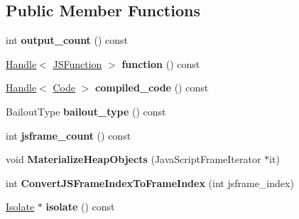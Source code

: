 \subsection*{Public Member Functions}
\begin{DoxyCompactItemize}
\item 
int {\bfseries output\+\_\+count} () const \hypertarget{classv8_1_1internal_1_1_deoptimizer_a9d094f3a522f8ade8b6616045354ca9d}{}\label{classv8_1_1internal_1_1_deoptimizer_a9d094f3a522f8ade8b6616045354ca9d}

\item 
\hyperlink{classv8_1_1internal_1_1_handle}{Handle}$<$ \hyperlink{classv8_1_1internal_1_1_j_s_function}{J\+S\+Function} $>$ {\bfseries function} () const \hypertarget{classv8_1_1internal_1_1_deoptimizer_a9599e6c218c79de5ce5399ac137181c4}{}\label{classv8_1_1internal_1_1_deoptimizer_a9599e6c218c79de5ce5399ac137181c4}

\item 
\hyperlink{classv8_1_1internal_1_1_handle}{Handle}$<$ \hyperlink{classv8_1_1internal_1_1_code}{Code} $>$ {\bfseries compiled\+\_\+code} () const \hypertarget{classv8_1_1internal_1_1_deoptimizer_a5efa915656110fd0b24db9472a23ed05}{}\label{classv8_1_1internal_1_1_deoptimizer_a5efa915656110fd0b24db9472a23ed05}

\item 
Bailout\+Type {\bfseries bailout\+\_\+type} () const \hypertarget{classv8_1_1internal_1_1_deoptimizer_a574e1be55b702fcd905c593e88a4e220}{}\label{classv8_1_1internal_1_1_deoptimizer_a574e1be55b702fcd905c593e88a4e220}

\item 
int {\bfseries jsframe\+\_\+count} () const \hypertarget{classv8_1_1internal_1_1_deoptimizer_aca6d326518745b46fad81099cf2bba12}{}\label{classv8_1_1internal_1_1_deoptimizer_aca6d326518745b46fad81099cf2bba12}

\item 
void {\bfseries Materialize\+Heap\+Objects} (Java\+Script\+Frame\+Iterator $\ast$it)\hypertarget{classv8_1_1internal_1_1_deoptimizer_a18582e80dbab1ed0c1f5950fd0b2da3b}{}\label{classv8_1_1internal_1_1_deoptimizer_a18582e80dbab1ed0c1f5950fd0b2da3b}

\item 
int {\bfseries Convert\+J\+S\+Frame\+Index\+To\+Frame\+Index} (int jsframe\+\_\+index)\hypertarget{classv8_1_1internal_1_1_deoptimizer_a1223f29e38a82108ea65481efce7b517}{}\label{classv8_1_1internal_1_1_deoptimizer_a1223f29e38a82108ea65481efce7b517}

\item 
\hyperlink{classv8_1_1internal_1_1_isolate}{Isolate} $\ast$ {\bfseries isolate} () const \hypertarget{classv8_1_1internal_1_1_deoptimizer_a071c35abe4dcc0c67202a0c2f3908993}{}\label{classv8_1_1internal_1_1_deoptimizer_a071c35abe4dcc0c67202a0c2f3908993}

\end{DoxyCompactItemize}
